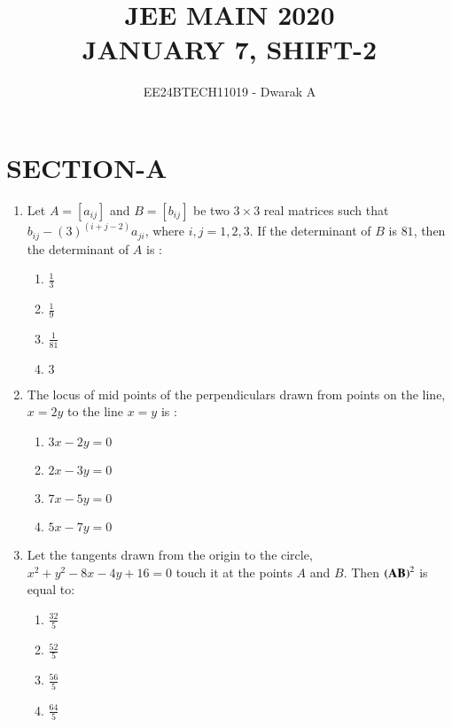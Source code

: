 \documentclass[journal,12pt,twocolumn]{IEEEtran}
\theoremstyle{remark}
\begin{document}

\vspace{3cm}

\title{\textbf{JEE MAIN 2020\\JANUARY 7, SHIFT-2}}
\author{EE24BTECH11019 - Dwarak A}
\maketitle
\newpage
\bigskip

\renewcommand{\thefigure}{\theenumi}
\renewcommand{\thetable}{\theenumi}

\section*{\textbf{SECTION-A}}
\bigskip

\begin{enumerate}

    \item Let $A=[a_{ij}]$ and $B=[b_{ij}]$ be two $3\times3$ real matrices such that $b_{ij}-(3)^{(i+j-2)}a_{ji}$, where $i,j=1,2,3$. If the determinant of $B$ is $81$, then the determinant of $A$ is :
        \begin{enumerate}
            \item $\frac{1}{3}$
            \item $\frac{1}{9}$
            \item $\frac{1}{81}$
            \item $3$
        \end{enumerate}

    \item The locus of mid points of the perpendiculars drawn from points on the line, $x=2y$ to the line $x=y$ is :
        \begin{enumerate}
            \item $3x-2y=0$
            \item $2x-3y=0$
            \item $7x-5y=0$
            \item $5x-7y=0$
        \end{enumerate}

    \item Let the tangents drawn from the origin to the circle, $x^2+y^2-8x-4y+16=0$ touch it at the points $A$ and $B$. Then $\left(\mathbf{AB}\right)^2$ is equal to:
        \begin{enumerate}
            \item $\frac{32}{5}$
            \item $\frac{52}{5}$
            \item $\frac{56}{5}$
            \item $\frac{64}{5}$
        \end{enumerate}


\end{enumerate}
\end{document}
